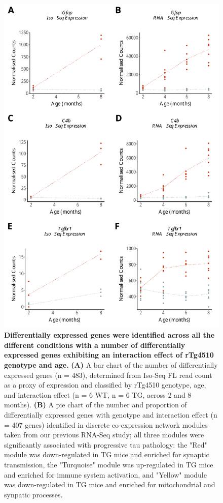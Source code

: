 \begin{figure}[h]
	\centering
	\includegraphics[page=4,trim={0 19cm 0 0},clip,scale = 0.55]{Figures/WholeDifferentialAnalysis.pdf}
	\captionsetup{width=0.95\textwidth}
	\caption[Differentially expressed genes classified by conditions]%
	{\textbf{Differentially expressed genes were identified across all the different conditions with a number of differentially expressed genes exhibiting an interaction effect of rTg4510 genotype and age.} \textbf{(A)} A bar chart of the number of differentially expressed genes (n = 483), determined from Iso-Seq FL read count as a proxy of expression and classified by rTg4510 genotype, age, and interaction effect (n = 6 WT, n = 6 TG, across 2 and 8 months). \textbf{(B)} A pie chart of the number and proportion of differentially expressed genes with genotype and interaction effect (n = 407 genes) identified in discrete co-expression network modules taken from our previous RNA-Seq study\cite{Castanho2020}; all three modules were significantly associated with progressive tau pathology: the "Red" module was down-regulated in TG mice and enriched for synaptic transmission, the "Turquoise" module was up-regulated in TG mice and enriched for immune system activation, and "Yellow" module was down-regulated in TG mice and enriched for mitochondrial and synpatic processes.}    
	\label{fig:dea_model_num}
\end{figure}


